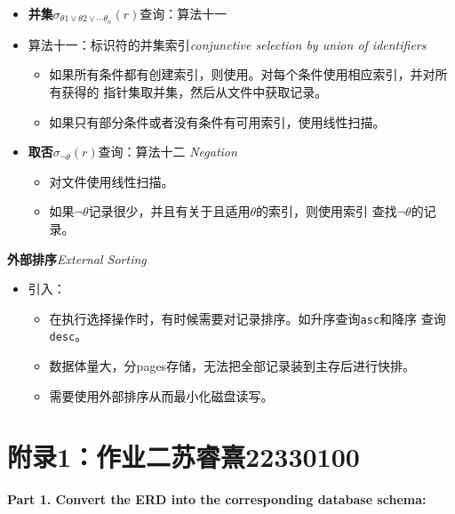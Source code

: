 \documentclass[b5paper, twoside]{article}
\let\oldtextbf\textbf
\renewcommand{\textbf}[1]{\textcolor{myblue}{\oldtextbf{#1}}}
\let\oldemph\emph
\renewcommand{\emph}[1]{\textcolor{mypink}{\oldemph{#1}}}
\begin{document}
\begin{itemize}
{	intersection of identifiers}
	\begin{itemize}
		\item 对每个条件使用相应的索引，并对所有获得的记录指针集合取交集。
		\item 如果某些条件没有合适索引，则在读到内存后再对他们进行该条件的测试。
	\end{itemize}
	\item[$\rightarrow$] \textbf{并集}$\sigma_{\theta1 \vee \theta2 \vee 
	\cdots \theta_n}(r)$查询：算法十一
	\item 算法十一：标识符的并集索引\hfill \emph{conjunctive selection by 
	union of identifiers}
	\begin{itemize}
		\item 如果所有条件都有创建索引，则使用。对每个条件使用相应索引，并对所有获得的
		指针集取并集，然后从文件中获取记录。
		\item 如果只有部分条件或者没有条件有可用索引，使用线性扫描。
	\end{itemize}
	\item[$\rightarrow$] 
	\textbf{取否}$\sigma_{\neg\theta}(r)$查询：算法十二\hfill 
	\emph{Negation}
	\begin{itemize}
		\item 对文件使用线性扫描。
		\item 如果$\neg\theta$记录很少，并且有关于且适用$\theta$的索引，则使用索引
		查找$\neg\theta$的记录。
	\end{itemize}
\end{itemize}

\textbf{外部排序}\hfill \emph{External Sorting}
\begin{itemize}
	\item 引入：
	\begin{itemize}
		\item 在执行选择操作时，有时候需要对记录排序。如升序查询\lstinline|asc|和降序
		查询\lstinline|desc|。
		\item 数据体量大，分pages存储，无法把全部记录装到主存后进行快排。
		\item 需要使用外部排序从而最小化磁盘读写。
	\end{itemize}
\end{itemize}

\tableofcontents

\newpage
\appendix
\section{附录1：作业二{\footnotesize 苏睿熹22330100}}
\textbf{Part 1. Convert the ERD into the corresponding database schema:}
\end{document}
